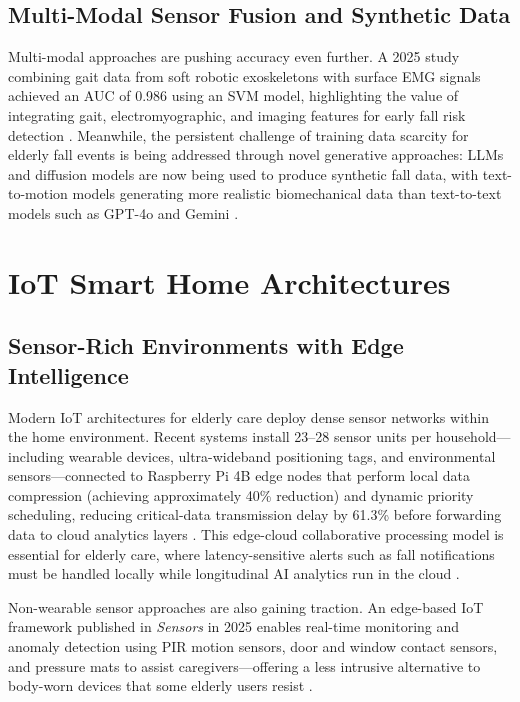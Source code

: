 \documentclass[conference]{IEEEtran}
\begin{document}
\subsection{Multi-Modal Sensor Fusion and Synthetic Data}

Multi-modal approaches are pushing accuracy even further. A 2025 study combining gait data from soft robotic exoskeletons with surface EMG signals achieved an AUC of 0.986 using an SVM model, highlighting the value of integrating gait, electromyographic, and imaging features for early fall risk detection \cite{frontiers_fusion}. Meanwhile, the persistent challenge of training data scarcity for elderly fall events is being addressed through novel generative approaches: LLMs and diffusion models are now being used to produce synthetic fall data, with text-to-motion models generating more realistic biomechanical data than text-to-text models such as GPT-4o and Gemini \cite{arxiv_llm_fall}.


\section{IoT Smart Home Architectures}

\subsection{Sensor-Rich Environments with Edge Intelligence}

Modern IoT architectures for elderly care deploy dense sensor networks within the home environment. Recent systems install 23--28 sensor units per household---including wearable devices, ultra-wideband positioning tags, and environmental sensors---connected to Raspberry Pi 4B edge nodes that perform local data compression (achieving approximately 40\% reduction) and dynamic priority scheduling, reducing critical-data transmission delay by 61.3\% before forwarding data to cloud analytics layers \cite{informatica_iot}. This edge-cloud collaborative processing model is essential for elderly care, where latency-sensitive alerts such as fall notifications must be handled locally while longitudinal AI analytics run in the cloud \cite{sensors_edge}.

Non-wearable sensor approaches are also gaining traction. An edge-based IoT framework published in \textit{Sensors} in 2025 enables real-time monitoring and anomaly detection using PIR motion sensors, door and window contact sensors, and pressure mats to assist caregivers---offering a less intrusive alternative to body-worn devices that some elderly users resist \cite{sensors_edge}.
\end{document}
